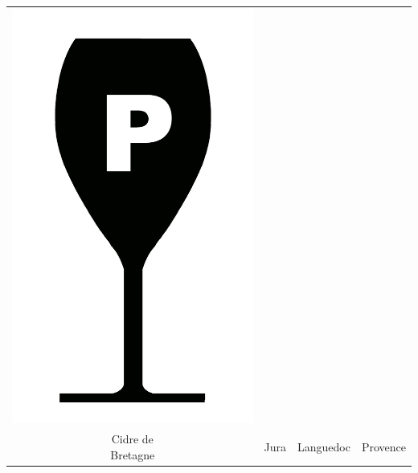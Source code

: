 {\begin{center}
\begin{tabular}{ c c c c}
\includegraphics[scale=0.021, trim= 0em -5em -5em -5em,]{Icones/icon_provence_black.pdf}
\\
	\makecell{Cidre de\\Bretagne}  & Jura & Languedoc & Provence \\
\end{tabular}
\end{center}
}
